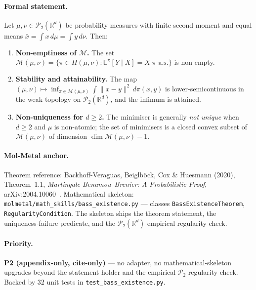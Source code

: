 \paragraph{Formal statement.}
\begin{theorem}
\label{thm:T8-bass-existence}
Let $\mu, \nu \in \mathcal{P}_2(\mathbb{R}^d)$ be probability
measures with finite second moment and equal means
$\bar{x} = \int x \, d\mu = \int y \, d\nu$.  Then:
\begin{enumerate}
  \item[(i)] \textbf{Non-emptiness of $\mathcal{M}$.}  The set
    $\mathcal{M}(\mu, \nu) = \{ \pi \in \Pi(\mu, \nu) :
    \mathbb{E}^{\pi}[Y \mid X] = X \; \pi\text{-a.s.} \}$ is non-empty.
  \item[(ii)] \textbf{Stability and attainability.}  The map
    $(\mu, \nu) \mapsto \inf_{\pi \in \mathcal{M}(\mu, \nu)}
    \int \|x - y\|^2 \, d\pi(x, y)$ is lower-semicontinuous in the
    weak topology on $\mathcal{P}_2(\mathbb{R}^d)$, and the infimum
    is attained.
  \item[(iii)] \textbf{Non-uniqueness for $d \ge 2$.}  The minimiser
    is generally \emph{not unique} when $d \ge 2$ and $\mu$ is
    non-atomic; the set of minimisers is a closed convex subset of
    $\mathcal{M}(\mu, \nu)$ of dimension
    $\dim \mathcal{M}(\mu, \nu) - 1$.
\end{enumerate}
\end{theorem}

\paragraph{Mol-Metal anchor.}
Theorem reference: Backhoff-Veraguas, Beiglb\"ock, Cox \& Huesmann
(2020), Theorem~1.1, \emph{Martingale Benamou--Brenier: A
Probabilistic Proof}, arXiv:2004.10060~\cite{backhoff_veraguas2020bass_existence}.
Mathematical skeleton:
\texttt{molmetal/math\_skills/bass\_existence.py} --- classes
\texttt{BassExistenceTheorem}, \texttt{RegularityCondition}.  The
skeleton ships the theorem statement, the uniqueness-failure
predicate, and the $\mathcal{P}_2(\mathbb{R}^d)$ empirical
regularity check.

\paragraph{Priority.}
\textbf{P2 (appendix-only, cite-only)} --- no adapter, no
mathematical-skeleton upgrades beyond the statement holder and the
empirical $\mathcal{P}_2$ regularity check.  Backed by 32 unit
tests in \texttt{test\_bass\_existence.py}.


